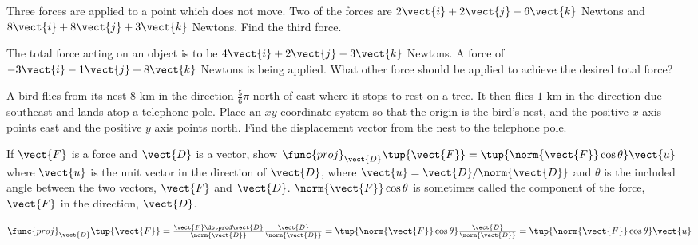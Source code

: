 \begin{enumialphparenastyle}
\begin{ex} Three forces are applied to a point which does not move. Two of the
forces are $2 \vect{i}+2 \vect{j} -6 \vect{k}$ Newtons and $8 \vect{i}+ 8 \vect{j}+ 3 \vect{k}$ Newtons. Find
the third force. \vspace{1mm}
\end{ex}

\begin{ex} The total force acting on an object is to be $4 \vect{i}+
 2 \vect{j} -3 \vect{k}$ Newtons. A force
of $-3 \vect{i} -1 \vect{j}+ 8
\vect{k}$ Newtons is being applied. What other force should be applied to
achieve the desired total force? \vspace{1mm}
\end{ex}

\begin{ex} A bird flies from its nest $8$ km in the direction $\frac{5}{6}\pi $
north of east where it stops to rest on a tree. It then flies $1$ km in the
direction due southeast and lands atop a telephone pole. Place an $xy$
coordinate system so that the origin is the bird's nest, and the positive 
$x$ axis points east and the positive $y$ axis points north. Find the
displacement vector from the nest to the telephone pole. \vspace{1mm}
\end{ex}


\begin{ex} If $\vect{F}$ is a force and $\vect{D}$ is a vector, show 
$\func{proj}_{\vect{D}}\tup{\vect{F}} =\tup{\norm{\vect{F}
} \cos \theta } \vect{u}$ where $\vect{u}$ is the unit
vector in the direction of $\vect{D}$, where $\vect{u}=\vect{D}/\norm{\vect{D}
} $ and $\theta $ is the included angle between the two vectors, 
$\vect{F}$ and $\vect{D}$. $\norm{\vect{F}} \cos \theta $
is sometimes called the component
 of the force, $\vect{F}$ in the direction, $\vect{D}$.
\begin{sol}
$\func{proj}_{\vect{D}}\tup{\vect{F}} = \frac{\vect{F}\dotprod
\vect{D}}{\norm{\vect{D}} }\frac{\vect{D}}{\norm{\vect{D}
} }=\tup{\norm{\vect{F}} \cos \theta }
\frac{\vect{D}}{\norm{\vect{D}} }=\tup{\norm{
\vect{F}} \cos \theta } \vect{u}$
\end{sol}
\end{ex}

\end{enumialphparenastyle}
